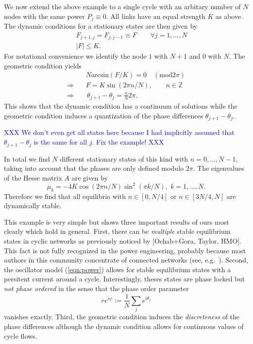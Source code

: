 \documentclass[10pt,aps,pra,onecolumn,superscriptaddress]{revtex4-1}
\newcommand{\dirk}[1]{\textcolor{blue}{#1}}
\newcommand{\be}{\begin{equation}}
\newcommand{\ee}{\end{equation}}
\newcommand{\bea}{\begin{eqnarray}}
\newcommand{\eea}{\end{eqnarray}}
\newcommand{\nn}{\nonumber}
\begin{document}
We now extend the above example to a single cycle with an
arbitary number of $N$ nodes with  the same power
$P_j \equiv 0$. All links have an equal strength $K$ as above.
The dynamic conditions for a stationary states are then given by
\bea
  && F_{j+1,j} = F_{j,j-1}  \equiv F \qquad \forall j = 1,\ldots,N  \\ 
  && |F| \le K.
\eea
For notational convenience we identify the node $1$ with $N+1$ and
$0$ with $N$.  The geometric condition yields
\bea
   && N \mbox{arcsin}(F/K) = 0 \quad (\mbox{mod} 2 \pi) \nn  \\
   \Rightarrow \, &&  F = K \sin(2\pi n/N), \qquad  n \in \mathbb{Z}\ \\  
   \Rightarrow \, && \, \theta_{j+1} - \theta_j = \frac{n}{N} 2 \pi .
\eea
This shows that the dynamic condition has a continuum of 
solutions while the geometric condition induces a 
quantization of the phase differences 
$\theta_{j+1} - \theta_j$. 

\dirk{XXX We don't even get all states here because I had implicitly assumed
that $\theta_{j+1} - \theta_j$ is the same for all $j$. Fix the example! XXX}

In total we find $N$ different stationary states of this kind
with $n = 0,\ldots,N-1$,
taking into account that the phases are only defined modulo
$2\pi$. The eigenvalues of the Hesse matrix $A$ are given
by
\be
     \mu_k = -4 K \cos(2\pi n/N) \sin^2(\pi k/N),
        \; k = 1,\ldots,N. \nn
\ee
Therefore we find that all equilibria with 
$n \in [0,N/4]$ or $n\in[3N/4,N]$ are dynamically 
stable.
 

This example is very simple but shows three important results
of ours most clearly which hold in general.
First, there can be \emph{multiple} stable equilibrium states in cyclic
networks as previously noticed by [Ochab+Gora, Taylor, HMO]. This fact is not
fully recognized in the power engineering, probably because most 
authors in this community concentrate of connected networks
(see, e.g.~\cite{Mach08}).
Second, the oscillator model (\ref{eqn:power}) allows for 
stable equilibrium states with a persitent current around a cycle.
Interestingly, theses states are phase locked but \emph{not phase
ordered} in the sense that the phase order parameter
\cite{Stro00}
\be
   r e^{i \psi} := \frac{1}{N} \sum_j e^{i \theta_j} 
   \label{eqn:deforder}
\ee
vanishes exactly.
Third, the geometric condition induces the 
\emph{discreteness} of the phase differences
although the dynamic condition allows for continuous
values of cycle flows.
\end{document}
